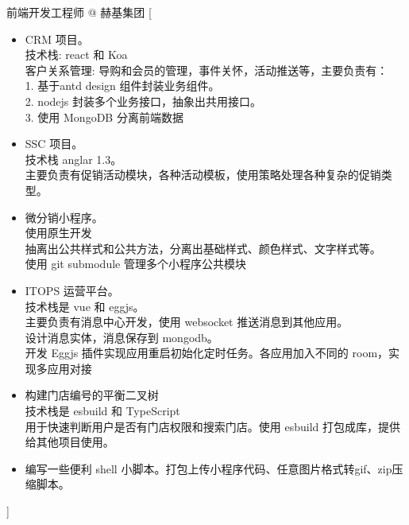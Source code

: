 \documentclass[zh]{resume}
\begin{document}
\begin{experiences}
    {前端开发工程师 @ 赫基集团}%
    [\begin{itemize}
      \item CRM 项目。\\ 技术栈: react 和 Koa \\ 客户关系管理: 导购和会员的管理，事件关怀，活动推送等，主要负责有：\\ 1. 基于antd design 组件封装业务组件。\\ 2. nodejs 封装多个业务接口，抽象出共用接口。 \\ 3. 使用 MongoDB 分离前端数据 \\ 
      \item SSC 项目。\\ 技术栈 anglar 1.3。\\ 主要负责有促销活动模块，各种活动模板，使用策略处理各种复杂的促销类型。 \\ 
      \item 微分销小程序。\\ 使用原生开发 \\ 抽离出公共样式和公共方法，分离出基础样式、颜色样式、文字样式等。\\ 使用 git submodule 管理多个小程序公共模块 \\ 
      \item ITOPS 运营平台。\\ 技术栈是 vue 和 eggjs。\\ 主要负责有消息中心开发，使用 websocket 推送消息到其他应用。\\ 设计消息实体，消息保存到 mongodb。\\ 开发 Eggjs 插件实现应用重启初始化定时任务。各应用加入不同的 room，实现多应用对接 \\ 
      \item 构建门店编号的平衡二叉树 \\ 技术栈是 esbuild 和 TypeScript \\ 用于快速判断用户是否有门店权限和搜索门店。使用 esbuild 打包成库，提供给其他项目使用。\\
      \item 编写一些便利 shell 小脚本。打包上传小程序代码、任意图片格式转gif、zip压缩脚本。 \\ 
    \end{itemize}]


\end{experiences}
\end{document}

